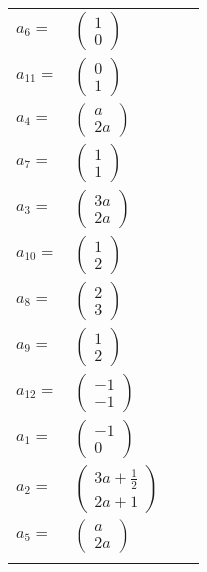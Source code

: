 \documentclass[1p]{elsarticle_modified}
\theoremstyle{definition}
\begin{document}
\begin{tabular}{m{7pt} m{180pt} m{7pt} m{180pt} }
\flushright $a_{6}=$&$\begin{pmatrix}1\\0\end{pmatrix}$ \\
\flushright $a_{11}=$&$\begin{pmatrix}0\\1\end{pmatrix}$ \\
\flushright $a_{4}=$&$\begin{pmatrix}a\\2 a\end{pmatrix}$ \\
\flushright $a_{7}=$&$\begin{pmatrix}1\\1\end{pmatrix}$ \\
\flushright $a_{3}=$&$\begin{pmatrix}3 a\\2 a\end{pmatrix}$ \\
\flushright $a_{10}=$&$\begin{pmatrix}1\\2\end{pmatrix}$ \\
\flushright $a_{8}=$&$\begin{pmatrix}2\\3\end{pmatrix}$ \\
\flushright $a_{9}=$&$\begin{pmatrix}1\\2\end{pmatrix}$ \\
\flushright $a_{12}=$&$\begin{pmatrix}-1\\-1\end{pmatrix}$ \\
\flushright $a_{1}=$&$\begin{pmatrix}-1\\0\end{pmatrix}$ \\
\flushright $a_{2}=$&$\begin{pmatrix}3 a+\frac{1}{2}\\2 a+1\end{pmatrix}$ \\
\flushright $a_{5}=$&$\begin{pmatrix}a\\2 a\end{pmatrix}$\\&\end{tabular}
\end{document}

